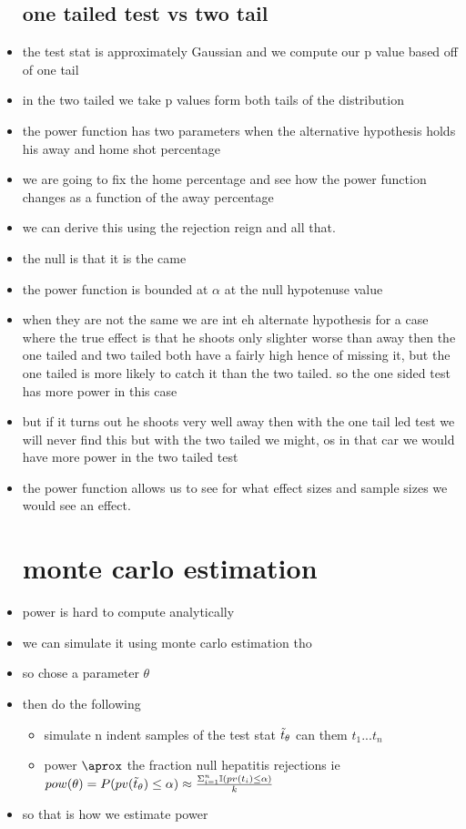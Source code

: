 \documentclass{article}
\begin{document}
\begin{itemize}
\subsection{one tailed test vs two tail}
\item the test stat is approximately Gaussian and we compute our p value based off of one tail
\item in the two tailed we take p values form both tails of the distribution 
\item the power function has two parameters when the alternative hypothesis holds his away and home shot percentage 
\item we are going to fix the home percentage and see how the power function changes as a function of the away percentage
\item we can derive this using the rejection reign and all that. 
\item the null is that it is the came 
\item the power function is bounded at $\alpha$ at the null hypotenuse value 
\item when they are not the same we are int eh alternate hypothesis 
\itme for a case where the true effect is that he shoots only slighter worse than away  then the one tailed and two tailed both have a fairly high hence of missing it, but the one tailed is more likely to catch it than the two tailed. so the one sided test has more power in this case
\item but if it turns out he shoots very well away then with the one tail led test we will never find this but with the two tailed we might, os in that car we would have more power in the two tailed test
\item the power function allows us to see for what effect sizes and sample sizes we would see an effect. 
\section{monte carlo estimation}
\item power is hard to compute analytically 
\item we can simulate it using monte carlo estimation tho 
\item so chose a parameter $\theta$
\item then do the following 
\begin{itemize}
    \item simulate n indent samples of the test stat $\Tilde{t}_{\theta}$ can them $t_1...t_n$
    \item power $\aprox$ the fraction null hepatitis rejections ie $pow(\theta)=P(pv(\Tilde{t}_{\theta})\leq \alpha)\approx \frac{\Sigma_{i=1}^{n}\mathbb{I}(pv(t_i)\leq \alpha)}{k}$
\end{itemize}
\item so that is how we estimate power 

\end{itemize}
\end{document}
